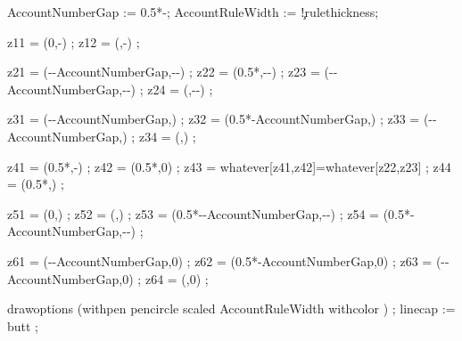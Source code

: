 

  AccountNumberGap := 0.5*\MPaccountmaxwidth-\MPaccountwidth ;
  AccountRuleWidth := \the\dimexpr\accountparameter\c!rulethickness\relax ;

  z11 = (0,\MPaccountmaxheight-\MPaccountheaderheight) ;
  z12 = (\MPaccountmaxwidth,\MPaccountmaxheight-\MPaccountheaderheight) ;

  z21 = (\MPaccountwidth-\MPaccountnumberwidth-AccountNumberGap,\MPaccountmaxheight-\MPaccountheaderheight-\MPaccountdebitheight) ;
  z22 = (0.5*\MPaccountmaxwidth,\MPaccountmaxheight-\MPaccountheaderheight-\MPaccountdebitheight) ;
  z23 = (\MPaccountmaxwidth-\MPaccountnumberwidth-AccountNumberGap,\MPaccountmaxheight-\MPaccountheaderheight-\MPaccountcreditheight) ;
  z24 = (\MPaccountmaxwidth,\MPaccountmaxheight-\MPaccountheaderheight-\MPaccountcreditheight) ;

  z31 = (\MPaccountwidth-\MPaccountnumberwidth-AccountNumberGap,\MPaccountfooterheight) ;
  z32 = (0.5*\MPaccountmaxwidth-AccountNumberGap,\MPaccountfooterheight) ;
  z33 = (\MPaccountmaxwidth-\MPaccountnumberwidth-AccountNumberGap,\MPaccountfooterheight) ;
  z34 = (\MPaccountmaxwidth,\MPaccountfooterheight) ;
  
  z41 = (0.5*\MPaccountmaxwidth,\MPaccountmaxheight-\MPaccountheaderheight) ;
  z42 = (0.5*\MPaccountmaxwidth,0) ;
  z43 = whatever[z41,z42]=whatever[z22,z23] ;
  z44 = (0.5*\MPaccountmaxwidth,\MPaccountfooterheight) ;

  z51 = (0,\MPaccountfooterheight) ;
  z52 = (\MPaccountnumberwidth,\MPaccountfooterheight) ;
  z53 = (0.5*\MPaccountmaxwidth-\MPaccountnumberwidth-AccountNumberGap,\MPaccountmaxheight-\MPaccountheaderheight-\MPaccountdebitheight) ;
  z54 = (0.5*\MPaccountmaxwidth-AccountNumberGap,\MPaccountmaxheight-\MPaccountheaderheight-\MPaccountdebitheight) ;
  
  z61 = (\MPaccountwidth-\MPaccountnumberwidth-AccountNumberGap,0) ;
  z62 = (0.5*\MPaccountmaxwidth-AccountNumberGap,0) ;
  z63 = (\MPaccountmaxwidth-\MPaccountnumberwidth-AccountNumberGap,0) ;
  z64 = (\MPaccountmaxwidth,0) ;

  drawoptions (withpen pencircle scaled AccountRuleWidth withcolor ) ;
  linecap := butt ; %

